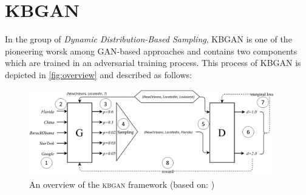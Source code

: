 \section{KBGAN} \label{sec:kbgan}
In the group of \textit{Dynamic Distribution-Based Sampling}, \ac{KBGAN} is one of the pioneering worsk among \ac{GAN}-based approaches and contains two components which are trained in an adversarial training process.
This process of \ac{KBGAN} is depicted in \autoref{fig:overview} and described as follows:
\begin{figure}[t]
  \centering
    \includegraphics[width=0.95\textwidth]{figures/kbgan_original.png}
  \caption{An overview of the \textsc{kbgan} framework (based on: \cite{cai2017kbgan})}
  \label{fig:overview}
\end{figure}

